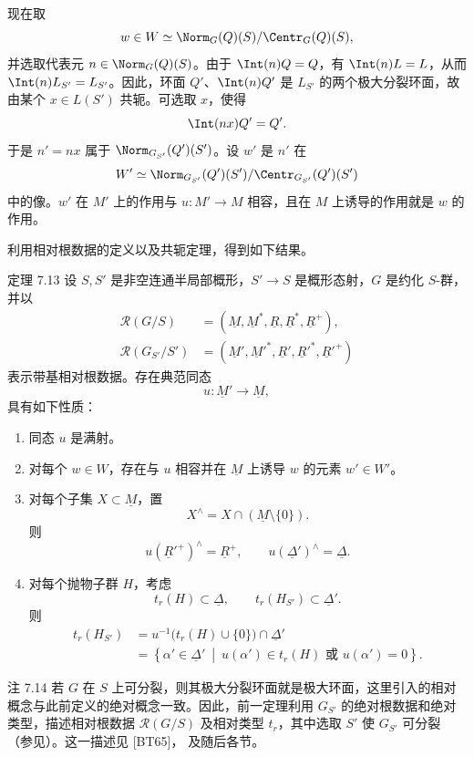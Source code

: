 现在取
\[
 w\in W\simeq\Norm_G(Q)(S)/\Centr_G(Q)(S),
\]
并选取代表元 \(n\in\Norm_G(Q)(S)\)。由于 \(\Int(n)Q=Q\)，有 \(\Int(n)L=L\)，从而 \(\Int(n)L_{S'}=L_{S'}\)。因此，环面 \(Q'\)、\(\Int(n)Q'\) 是 \(L_{S'}\) 的两个极大分裂环面，故由某个 \(x\in L(S')\) 共轭。可选取 \(x\)，使得
\[
 \Int(nx)Q'=Q'.
\]
于是 \(n'=nx\) 属于 \(\Norm_{G_{S'}}(Q')(S')\)。设 \(w'\) 是 \(n'\) 在
\[
 W'\simeq
 \Norm_{G_{S'}}(Q')(S')/\Centr_{G_{S'}}(Q')(S')
\]
中的像。\(w'\) 在 \(M'\) 上的作用与 \(u:M'\to M\) 相容，且在 \(M\) 上诱导的作用就是 \(w\) 的作用。

利用相对根数据的定义以及共轭定理，得到如下结果。

\begin{sgastatement}{定理 7.13}
设 \(S,S'\) 是非空连通半局部概形，\(S'\to S\) 是概形态射，\(G\) 是约化 \(S\)-群，并以
\[
\begin{aligned}
 \mathcal R(G/S)
  &=(\underline M,\underline M^*,\underline R,
     \underline R^*,\underline R^+),\\
 \mathcal R(G_{S'}/S')
  &=(\underline M',\underline M'^*,\underline R',
     \underline R'^*,\underline R'^+)
\end{aligned}
\]
表示带基相对根数据。存在典范同态
\[
 u:\underline M'\longrightarrow\underline M,
\]
具有如下性质：
\begin{enumerate}[label=\textup{(\roman*)}]
\item 同态 \(u\) 是满射。
\item 对每个 \(w\in W\)，存在与 \(u\) 相容并在 \(\underline M\) 上诱导 \(w\) 的元素 \(w'\in W'\)。
\item 对每个子集 \(X\subset\underline M\)，置
\[
 X^\wedge=X\cap(\underline M\setminus\{0\}).
\]
则
\[
 u(\underline R'^+)^\wedge=\underline R^+,
 \qquad
 u(\underline\Delta')^\wedge=\underline\Delta.
\]
\item 对每个抛物子群 \(H\)，考虑
\[
 t_r(H)\subset\underline\Delta,
 \qquad
 t_r(H_{S'})\subset\underline\Delta'.
\]
则
\[
\begin{aligned}
 t_r(H_{S'})
 &=u^{-1}\bigl(t_r(H)\cup\{0\}\bigr)
       \cap\underline\Delta'\\
 &=\left\{\alpha'\in\underline\Delta'
       \ \middle|\ 
       u(\alpha')\in t_r(H)\text{ 或 }u(\alpha')=0
   \right\}.
\end{aligned}
\]
\end{enumerate}
\end{sgastatement}

\begin{sgastatement}{注 7.14}
若 \(G\) 在 \(S\) 上可分裂，则其极大分裂环面就是极大环面，这里引入的相对概念与此前定义的绝对概念一致。因此，前一定理利用 \(G_{S'}\) 的绝对根数据和绝对类型，描述相对根数据 \(\mathcal R(G/S)\) 及相对类型 \(t_r\)，其中选取 \(S'\) 使 \(G_{S'}\) 可分裂 \textup{（参见）}。这一描述见 \textup{[BT65]}， 及随后各节。
\end{sgastatement}

